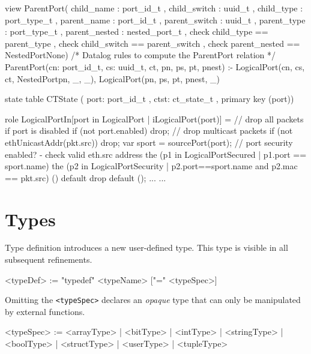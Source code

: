 \documentclass{report}
\newcommand{\src}[1]{\texttt{#1}}
\begin{document}
\begin{ccnlisting}{}
{    view ParentPort( child_name    : port_id_t
                   , child_switch  : uuid_t
                   , child_type    : port_type_t
                   , parent_name   : port_id_t
                   , parent_switch : uuid_t
                   , parent_type   : port_type_t
                   , parent_nested : nested_port_t
                   , check child_type == parent_type
                   , check child_switch == parent_switch
                   , check parent_nested == NestedPortNone{})
    /* Datalog rules to compute the ParentPort relation */
    ParentPort(cn: port_id_t, cs: uuid_t, ct, pn, ps, pt, pnest) :- 
        LogicalPort(cn, cs, ct, NestedPort{pn, _}, _),
        LogicalPort(pn, ps, pt, pnest, _)

    state table CTState ( port: port_id_t
                        , ctst: ct_state_t
                        , primary key (port))
    
    role LogicalPortIn[port in LogicalPort | iLogicalPort(port)] = {
        // drop all packets if port is disabled
        if (not port.enabled) drop;
        // drop multicast packets
        if (not ethUnicastAddr(pkt.src)) drop;
        var sport = sourcePort(port);
        // port security enabled? - check valid eth.src address
        the (p1 in LogicalPortSecured | p1.port == sport.name) {
            the (p2 in LogicalPortSecurity 
                 | p2.port==sport.name and p2.mac == pkt.src) {
                ()
            } default {
                drop
            }
        } default ();
        ...
    }
    ...
}
\end{ccnlisting}
    
\section{Types}

Type definition introduces a new user-defined type.  This type is visible in all
subsequent refinements.

\begin{bnflisting}{}
<typeDef> := "typedef" <typeName> ["=" <typeSpec>]
\end{bnflisting}

Omitting the \src{<typeSpec>} declares an \emph{opaque} type
that can only be manipulated by external functions.

\begin{bnflisting}{}
<typeSpec> := <arrayType>
            | <bitType>
            | <intType>
            | <stringType>
            | <boolType>
            | <structType>
            | <userType>
            | <tupleType>
\end{bnflisting}
\end{document}
